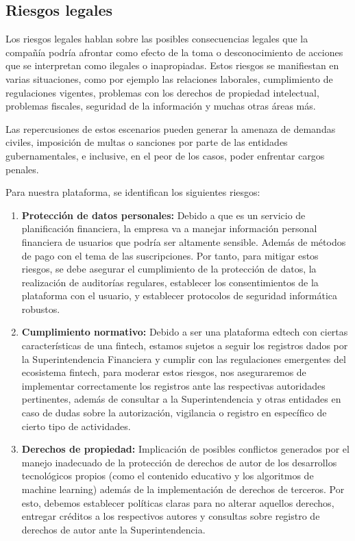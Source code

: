 {}
\subsection*{Riesgos legales}


Los riesgos legales hablan sobre las posibles consecuencias legales que la compañía podría afrontar como efecto de la toma o desconocimiento de acciones que se interpretan como ilegales o inapropiadas. Estos riesgos se manifiestan en varias situaciones, como por ejemplo las relaciones laborales, cumplimiento de regulaciones vigentes, problemas con los derechos de propiedad intelectual, problemas fiscales, seguridad de la información y muchas otras áreas más.

Las repercusiones de estos escenarios pueden generar la amenaza de demandas civiles, imposición de multas o sanciones por parte de las entidades gubernamentales, e inclusive, en el peor de los casos, poder enfrentar cargos penales. 

Para nuestra plataforma, se identifican los siguientes riesgos:

\begin{enumerate}
	\item \textbf{Protección de datos personales:} Debido a que es un servicio de planificación financiera, la empresa va a manejar información personal financiera de usuarios que podría ser altamente sensible. Además de métodos de pago con el tema de las suscripciones. Por tanto, para mitigar estos riesgos, se debe asegurar el cumplimiento de la protección de datos, la realización de auditorías regulares, establecer los consentimientos de la plataforma con el usuario, y establecer protocolos de seguridad informática robustos.
	
	\item \textbf{Cumplimiento normativo:} Debido a ser una plataforma edtech con ciertas características de una fintech, estamos sujetos a seguir los registros dados por la Superintendencia Financiera y cumplir con las regulaciones emergentes del ecosistema fintech, para moderar estos riesgos, nos aseguraremos de implementar correctamente los registros ante las respectivas autoridades pertinentes, además de consultar a la Superintendencia y otras entidades en caso de dudas sobre la autorización, vigilancia o registro en específico de cierto tipo de actividades.
	
	\item \textbf{Derechos de propiedad:} Implicación de posibles conflictos generados por el manejo inadecuado de la protección de derechos de autor de los desarrollos tecnológicos propios (como el contenido educativo y los algoritmos de machine learning) además de la implementación de derechos de terceros. Por esto, debemos establecer políticas claras para no alterar aquellos derechos, entregar créditos a los respectivos autores y consultas sobre registro de derechos de autor ante la Superintendencia.
\end{enumerate}
